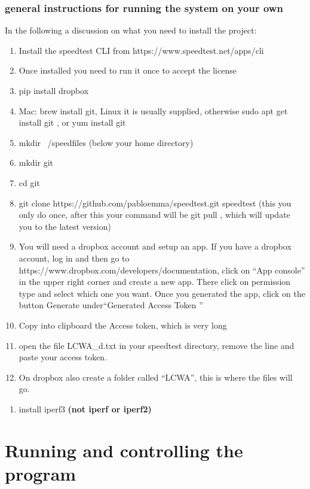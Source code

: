 \documentclass[12pt]{article}
\begin{document}
\subsubsection{general instructions for running the system on your own}
In the following a discussion on what you need to install the project:
\begin{enumerate}
\item	Install the speedtest CLI from  https://www.speedtest.net/apps/cli
\item Once installed you need to run it once to accept the license
\item pip install dropbox
\item Mac: brew install git, Linux it is usually supplied, otherwise sudo apt get install git , or yum install git
\item mkdir ~/speedfiles (below your home directory)
\item mkdir git
\item cd git
\item git clone https://github.com/pabloemma/speedtest.git speedtest (this you only do once, after this your command will be git pull , which will update you to the latest version)
\item You will need a dropbox account and setup an app. If you have a dropbox account, log in and then go to https://www.dropbox.com/developers/documentation, click on ``App console'' in the upper right corner and create a new app. There click on permission type and select which one you want. Once you generated the app, click on the button Generate under``Generated Access Token ''
\item Copy into clipboard the Access token, which is very long
\item open the file LCWA\_d.txt in your speedtest directory, remove the line and paste your access token.
\item On dropbox also create a folder called ``LCWA'', this is where the files will go.
\end{enumerate}


\begin{enumerate}
\item install iperf3 \textbf{(not iperf or iperf2)}
\end{enumerate}



\section{Running and controlling the program}
\end{document}
